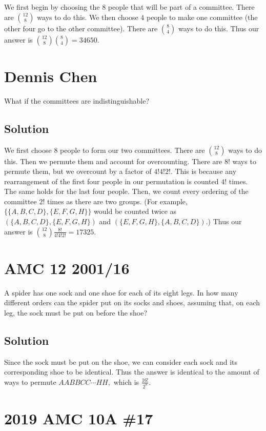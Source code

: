 \documentclass[blue,onecol]{shooting}
\begin{document}
We first begin by choosing the $8$ people that will be part of a committee. There are $\binom{12}{8}$ ways to do this. We then choose $4$ people to make one committee (the other four go to the other committee). There are $\binom{8}{4}$ ways to do this. Thus our answer is $\binom{12}{8}\binom{8}{4}=34650.$

\section{Dennis Chen}

What if the committees are indistinguishable?

\subsection{Solution}

We first choose $8$ people to form our two committees. There are $\binom{12}{8}$ ways to do this. Then we permute them and account for overcounting. There are $8!$ ways to permute them, but we overcount by a factor of $4!4!2!.$ This is because any rearrangement of the first four people in our permutation is counted $4!$ times. The same holds for the last four people. Then, we count every ordering of the committee $2!$ times as there are two groups. (For example, $\{\{A,B,C,D\},\{E,F,G,H\}\}$ would be counted twice as $(\{A,B,C,D\},\{E,F,G,H\})$ and $(\{E,F,G,H\},\{A,B,C,D\}).$) Thus our answer is $\binom{12}{8}\frac{8!}{4!4!2!}=17325.$

\section{AMC 12 2001/16}

A spider has one sock and one shoe for each of its eight legs. In how many different orders can the spider put on its socks and shoes, assuming that, on each leg, the sock must be put on before the shoe?

\subsection{Solution}

Since the sock must be put on the shoe, we can consider each sock and its corresponding shoe to be identical. Thus the answer is identical to the amount of ways to permute $AABBCC\cdots HH,$ which is $\frac{16!}{2^8}.$

\section{2019 AMC 10A \#17}
\end{document}

